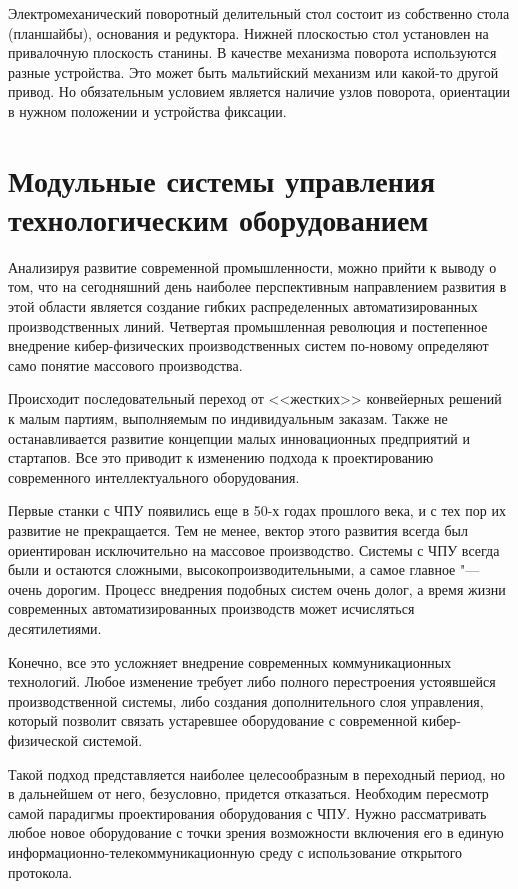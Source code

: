 Электромеханический поворотный делительный стол состоит из собственно стола (планшайбы), основания и редуктора. Нижней плоскостью стол установлен на привалочную плоскость станины. В качестве механизма поворота используются разные устройства. Это может быть мальтийский механизм или какой-то другой привод. Но обязательным условием является наличие узлов поворота, ориентации в нужном положении и устройства фиксации.

\section{Модульные системы управления технологическим оборудованием}\label{sec:ch1/sec2}

Анализируя развитие современной промышленности, можно прийти к выводу о том, что на сегодняшний день наиболее перспективным направлением развития в этой области является создание гибких распределенных автоматизированных производственных линий. Четвертая промышленная революция и постепенное внедрение кибер-физических производственных систем по-новому определяют само понятие массового производства.

Происходит последовательный переход от <<жестких>> конвейерных решений к малым партиям, выполняемым по индивидуальным заказам. Также не останавливается развитие  концепции малых инновационных предприятий и стартапов. Все это приводит к изменению подхода к проектированию современного интеллектуального оборудования. 

Первые станки с ЧПУ появились еще в 50-х годах прошлого века, и с тех пор их развитие не прекращается. Тем не менее, вектор этого развития всегда был ориентирован исключительно на массовое производство. Системы с ЧПУ всегда были и остаются сложными, высокопроизводительными, а самое главное "--- очень дорогим. Процесс внедрения подобных систем очень долог, а время жизни современных автоматизированных производств может исчисляться десятилетиями.

Конечно, все это усложняет внедрение современных коммуникационных технологий. Любое изменение требует либо полного перестроения устоявшейся производственной системы, либо создания дополнительного слоя управления, который позволит связать устаревшее оборудование с современной кибер-физической системой.

Такой подход представляется наиболее целесообразным в переходный период, но в дальнейшем от него, безусловно, придется отказаться. Необходим пересмотр самой парадигмы проектирования оборудования с ЧПУ. Нужно рассматривать любое новое оборудование с точки зрения возможности включения его в единую информационно-телекоммуникационную среду с использование открытого протокола.

